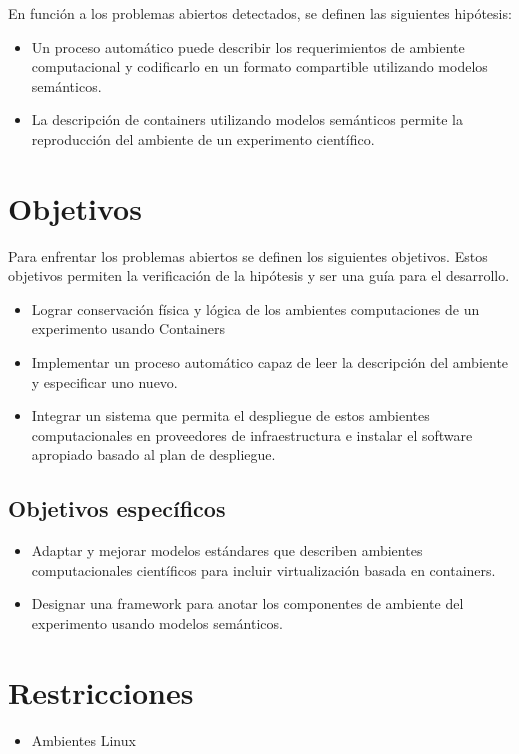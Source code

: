 En función a los problemas abiertos detectados, se definen las siguientes hipótesis:

\begin{itemize}
	\item Un proceso automático puede describir los requerimientos de ambiente computacional y codificarlo en un formato compartible  utilizando modelos semánticos.
	\item La descripción de containers utilizando modelos semánticos permite la reproducción del ambiente de un experimento científico.
\end{itemize}


\section{Objetivos}

Para enfrentar los problemas abiertos se definen los siguientes objetivos. Estos objetivos permiten la verificación de la hipótesis y ser una guía para el desarrollo.


\begin{itemize}
	\item Lograr conservación física y lógica de los ambientes computaciones de un experimento usando Containers
	\item Implementar un proceso automático capaz de leer la descripción del ambiente y especificar uno nuevo.
	\item Integrar un sistema que permita el despliegue de estos ambientes computacionales en proveedores de infraestructura e instalar el software apropiado basado al plan de despliegue.
\end{itemize}

\subsection{Objetivos específicos}

\begin{itemize}
	\item Adaptar y mejorar modelos estándares que describen ambientes computacionales científicos para incluir virtualización basada en containers.
	\item Designar una framework para anotar los componentes de ambiente del experimento usando modelos semánticos.
\end{itemize}



\section{Restricciones}

\begin{itemize}
	\item Ambientes Linux
\end{itemize}